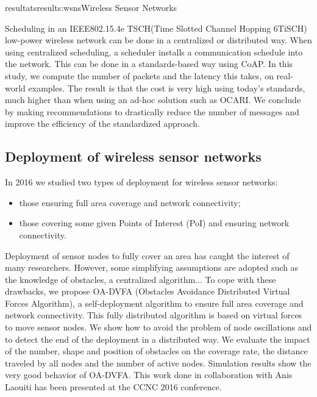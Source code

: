 \documentclass{ra2016}
\begin{document}
\begin{module}{resultats}{results:wsns}{Wireless Sensor Networks}
\begin{participants}
\end{participants}

Scheduling in an IEEE802.15.4e TSCH(Time Slotted Channel Hopping 6TiSCH) low-power wireless network can be done in a centralized or distributed way. When using centralized scheduling, a scheduler installs a communication schedule into the network. This can be done in a standards-based way using CoAP. In this study, we compute the number of packets  and the latency this takes, on real-world examples. The result is that the cost is very high using today's standards, much higher than when using an ad-hoc solution such as OCARI. We conclude by making recommendations to drastically reduce the number of messages and improve the efficiency of the standardized approach.

\subsection{Deployment of wireless sensor networks}

\begin{participants}
\end{participants}
In 2016 we studied two types of deployment for wireless sensor networks:
\begin{itemize}
\item those ensuring full area coverage and network connectivity;
\item those covering some given Points of Interest (PoI) and ensuring network connectivity.\\
\end{itemize}

Deployment of sensor nodes to fully cover an area has caught the interest of many researchers. However, some simplifying assumptions are adopted such as the knowledge of obstacles, a centralized algorithm... To cope with these drawbacks, we propose OA-DVFA (Obstacles Avoidance Distributed Virtual Forces Algorithm), a self-deployment algorithm to ensure full area coverage and network connectivity.  This fully distributed algorithm is based on virtual forces to move sensor nodes. We show how to avoid the problem of node oscillations and to detect the end of the deployment in a distributed way. 
We evaluate the impact of the number, shape and position of obstacles on the coverage rate, the distance traveled by all nodes and the number of active nodes. Simulation results show the very good behavior of OA-DVFA. This work done in collaboration with Anis Laouiti  has been presented at the CCNC 2016 conference.\\


\end{module}
\end{document}
